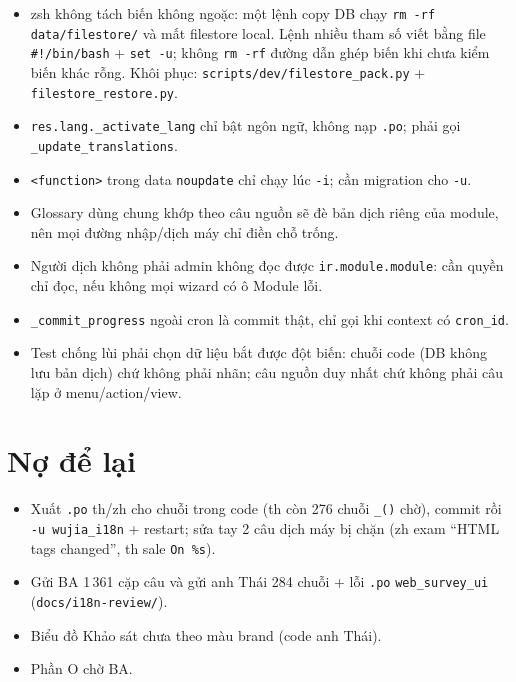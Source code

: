 \begin{itemize}[nosep]
\item zsh không tách biến không ngoặc: một lệnh copy DB chạy \texttt{rm -rf data/filestore/} và mất filestore local. Lệnh nhiều tham số
  viết bằng file \texttt{\#!/bin/bash} + \texttt{set -u}; không \texttt{rm -rf} đường dẫn ghép biến khi chưa kiểm biến khác rỗng.
  Khôi phục: \texttt{scripts/dev/filestore\_pack.py} + \texttt{filestore\_restore.py}.
\item \texttt{res.lang.\_activate\_lang} chỉ bật ngôn ngữ, không nạp \texttt{.po}; phải gọi \texttt{\_update\_translations}.
\item \texttt{<function>} trong data \texttt{noupdate} chỉ chạy lúc \texttt{-i}; cần migration cho \texttt{-u}.
\item Glossary dùng chung khớp theo câu nguồn sẽ đè bản dịch riêng của module, nên mọi đường nhập/dịch máy chỉ điền chỗ trống.
\item Người dịch không phải admin không đọc được \texttt{ir.module.module}: cần quyền chỉ đọc, nếu không mọi wizard có ô Module lỗi.
\item \texttt{\_commit\_progress} ngoài cron là commit thật, chỉ gọi khi context có \texttt{cron\_id}.
\item Test chống lùi phải chọn dữ liệu bắt được đột biến: chuỗi code (DB không lưu bản dịch) chứ không phải nhãn; câu nguồn duy nhất
  chứ không phải câu lặp ở menu/action/view.
\end{itemize}

\section{Nợ để lại}

\begin{itemize}[nosep]
\item Xuất \texttt{.po} th/zh cho chuỗi trong code (th còn 276 chuỗi \texttt{\_()} chờ), commit rồi \texttt{-u wujia\_i18n} + restart;
  sửa tay 2 câu dịch máy bị chặn (zh exam ``HTML tags changed'', th sale \texttt{On \%s}).
\item Gửi BA 1\,361 cặp câu và gửi anh Thái 284 chuỗi + lỗi \texttt{.po} \texttt{web\_survey\_ui} (\texttt{docs/i18n-review/}).
\item Biểu đồ Khảo sát chưa theo màu brand (code anh Thái).
\item Phần O chờ BA.
\end{itemize}
